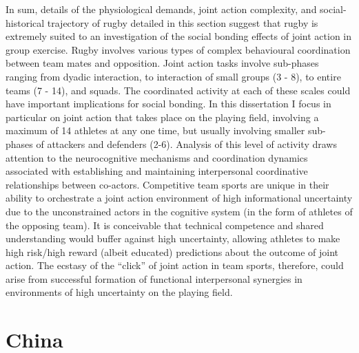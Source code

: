 \begin{CJK}{UTF8}{gbsn}
In sum, details of the physiological demands, joint action complexity, and social-historical trajectory of rugby detailed in this section suggest that rugby is extremely suited to an investigation of the social bonding effects of joint action in group exercise.  Rugby involves various types of complex behavioural coordination between team mates and opposition.  Joint action tasks involve sub-phases ranging from dyadic interaction, to interaction of small groups (3 - 8), to entire teams (7 - 14), and squads.  The coordinated activity at each of these scales could have important implications for social bonding.  In this dissertation I focus in particular on joint action that takes place on the playing field, involving a maximum of 14 athletes at any one time, but usually involving smaller sub-phases of attackers and defenders (2-6).  Analysis of this level of activity draws attention to the neurocognitive mechanisms and coordination dynamics associated with establishing and maintaining interpersonal coordinative relationships between co-actors.  Competitive team sports are unique in their ability to orchestrate a joint action environment of high informational uncertainty due to the unconstrained actors in the cognitive system (in the form of athletes of the opposing team).  It is conceivable that technical competence and shared understanding would buffer against high uncertainty, allowing athletes to make high risk/high reward (albeit educated) predictions about the outcome of joint action.  The ecstasy of the ``click'' of joint action in team sports, therefore, could arise from successful formation of functional interpersonal synergies in environments of high uncertainty on the playing field.












\section{China}


\end{CJK}
